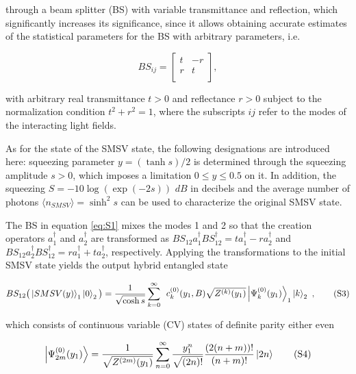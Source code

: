 \documentclass{optica-article}
\begin{document}
\!\!\!\!\!\!through a beam splitter (BS) with variable transmittance and reflection, which significantly increases its significance, since it allows obtaining accurate estimates of the statistical parameters for the BS with arbitrary parameters, i.e. 

\begin{equation}\label{eq:S2}
    BS_{ij} =
    \begin{bmatrix}
        t & -r  \\
        r & t  \\
      \end{bmatrix},
      \tag{S2}
\end{equation}


\!\!\!\!\!\!with arbitrary real transmittance $t>0$ and reflectance $r>0$  subject to the normalization condition $t^2+r^2=1$, where the subscripts $ij$ refer to the modes of the interacting light fields. 
\par As for the state of the SMSV state, the following designations are introduced here: squeezing parameter
$y = (\tanh s) /2$ is determined through 
the squeezing amplitude $s>0$, which imposes a limitation 
$0\leq y\leq0.5$ on it. In addition, the squeezing $S=-10\log(\exp(-2s)) \,\,dB$ in decibels and the average number of photons $\langle n_{SMSV} \rangle= \sinh^2 s$ can be used to characterize the original SMSV state.
\par The BS in equation \eqref{eq:S1}  mixes the modes 1 and 2 so that the creation operators $a_1^\dagger$ and $a_2^\dagger$ are transformed as $BS_{12}a_1^\dagger BS_{12}^\dagger=ta_1^\dagger-ra_2^\dagger$ and $BS_{12}a_2^\dagger BS_{12}^\dagger=ra_1^\dagger+ta_2^\dagger$, respectively. Applying the transformations to the initial SMSV state yields the output hybrid entangled state \cite{chap2:1,chap2:2}



\begin{equation}\label{eq:S3}
    BS_{12}\big(\ket{SMSV(y)}_1\ket{0}_2\big) = 
    \frac{1}{\sqrt{\cosh s}}\sum_{k=0}^{\infty} 
        \begin{array}{c}
            c_k^{(0)}(y_1,B)\sqrt{Z^{(k)}(y_1)}\ket{\Psi_k^{(0)}(y_1)}_1 \ket{k}_2
        \end{array} ,
    \tag{S3}
\end{equation}

\!\!\!\!\!\!which consists of continuous variable (CV) states of definite parity either even 

\begin{equation}\label{eq:S4}
    \ket{\Psi_{2m}^{(0)}(y_1)} =
    \frac{1}{\sqrt{Z^{(2m)}(y_1)}}\sum_{n=0}^{\infty} \frac{y_1^{n}}{\sqrt{(2n)!}}\frac{(2(n+m))!}{(n+m)!}\ket{2n}  
\tag{S4}
\end{equation}
\end{document}
